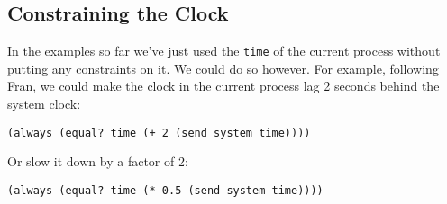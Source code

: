 \documentclass{article}
\begin{document}




\subsection{Constraining the Clock}

In the examples so far we've just used the \verb|time| of the current
process without putting any constraints on it.  We could do so however.
For example, following Fran, we could make the clock in the current process
lag 2 seconds behind the system clock:

\begin{verbatim}
(always (equal? time (+ 2 (send system time))))
\end{verbatim}

Or slow it down by a factor of 2:

\begin{verbatim}
(always (equal? time (* 0.5 (send system time))))
\end{verbatim}
\end{document}
